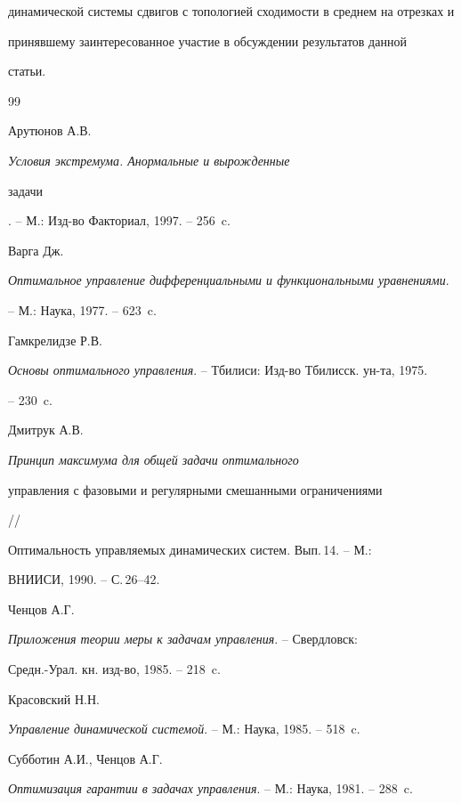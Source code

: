 динамической системы сдвигов с топологией сходимости в среднем на отрезках и


принявшему заинтересованное участие в обсуждении результатов данной


статьи.





\begin{thebibliography}{99}







Арутюнов А.В. {\em Условия экстремума. Анормальные и вырожденные


задачи}. -- М.: Изд-во Факториал, 1997. -- 256~c.




Варга Дж.


{\em Оптимальное управление дифференциальными и функциональными уравнениями}.


-- М.: Наука, 1977. -- 623~c.




Гамкрелидзе Р.В.


{\em Основы оптимального управления}. -- Тбилиси: Изд-во Тбилисск. ун-та, 1975.


-- 230~c.




Дмитрук А.В.


{\em Принцип максимума для общей задачи оптимального


управления с фазовыми и регулярными смешанными ограничениями} //


Оптимальность управляемых динамических систем. Вып.\,14. -- М.:


ВНИИСИ, 1990. -- С.\,26--42.




Ченцов А.Г.


{\em Приложения теории меры к задачам управления}. -- Свердловск:


Средн.-Урал. кн. изд-во, 1985. -- 218~c.




Красовский Н.Н.


{\em Управление динамической системой}. -- М.: Наука, 1985. -- 518~c.




Субботин А.И., Ченцов А.Г.


{\em Оптимизация гарантии в задачах управления}. -- М.: Наука, 1981. -- 288~c.



\end{thebibliography}
